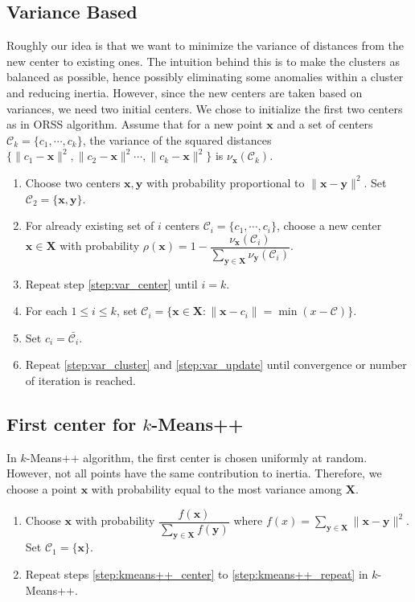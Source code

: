 \documentclass[twoside, 11pt]{article}
\newcommand{\x}{\mathbf{x}}
\newcommand{\X}{\mathbf{X}}
\newcommand{\y}{\mathbf{y}}
\newcommand{\C}{\mathcal{C}}
\begin{document}
	\subsection{Variance Based}
	Roughly our idea is that we want to minimize the variance of distances from the new center to existing ones. The intuition behind this is to make the clusters as balanced as possible, hence possibly eliminating some anomalies within a cluster and reducing inertia. However, since the new centers are taken based on variances, we need two initial centers. We chose to initialize the first two centers as in ORSS algorithm. Assume that for a new point $\x$ and a set of centers $\C_k=\{c_1,\cdots,c_k\}$, the variance of the squared distances $\{\| c_1-\x\|^2,\|c_2-\x\|^2\cdots,\| c_k-\x\|^2\}$ is $\nu_\x(\C_k)$.
		\begin{enumerate}[i]
			\item Choose two centers $\x,\y$ with probability proportional to $\|\x-\y\|^2$. Set $\C_2=\{\x,\y\}$.
			\item For already existing set of $i$ centers $\mathcal{C}_i=\{c_1,\cdots,c_i\}$, choose a new center $\x\in\X$ with probability $\rho(\x)=1-\dfrac{\nu_\x(\C_i)}{\sum_{\y\in\X}\nu_\y(\C_i)}$.\label{step:var_center}
			\item Repeat step \eqref{step:var_center} until $i=k$.
			\item For each $1\leq i\leq k$, set $\C_i=\{\x\in\X:\|\x-c_i\|=\min(x-\C)\}$.\label{step:var_cluster}
			\item Set $c_i=\bar{\C_i}$.\label{step:var_update}
			\item Repeat \eqref{step:var_cluster} and \eqref{step:var_update} until convergence or number of iteration is reached.
		\end{enumerate}
	\subsection{First center for $k$-Means++}
	In $k$-Means++ algorithm, the first center is chosen uniformly at random. However, not all points have the same contribution to inertia. Therefore, we choose a point $\x$ with probability equal to the most variance among $\X$.
		\begin{enumerate}[i]
			\item Choose $\x$ with probability $\dfrac{f(\x)}{\sum_{\y\in\X}f(\y)}$ where $f(x)=\sum_{\y\in\X}\|\x-\y\|^2$. Set $\C_1=\{\x\}$.
			\item Repeat steps \eqref{step:kmeans++_center} to \eqref{step:kmeans++_repeat} in $k$-Means++.
		\end{enumerate}
\end{document}
